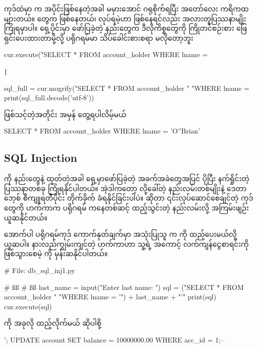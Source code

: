  ကုဒ်ထဲမှာ  က  အပိုင်းဖြစ်နေတဲ့အခါ မမှားအောင် ဂရုစိုက်ရပြီး အတော်လေး ကရိကထများတယ်။  တွေက  ဖြစ်နေတယ်၊  လုပ်ရမဲ့ဟာ ဖြစ်နေရင်လည်း အလားတူပြဿနာမျိုး ကြုံရမှာပါ။ ရှေ့ပိုင်းမှာ ဖော်ပြခဲ့တဲ့ နည်းတွေက ဒီလိုကိစ္စတွေကို ကြိုတင်စဉ်းစား ဖြေရှင်းပေးထားတာမို့လို့ ပရိုဂရမ်မာ သိပ်ခေါင်းစားစရာ မလိုတော့ဘူး
%
\begin{py}
cur.execute("SELECT * FROM account_holder WHERE lname = %
\end{py}
%
\texttt|%
%
\begin{py}
sql_full = cur.mogrify("SELECT * FROM account_holder "
                       "WHERE lname = %
print(sql_full.decode('utf-8'))
\end{py}
%
ဖြစ်သင့်တဲ့အတိုင်း  အမှန် တွေ့ရပါလိမ့်မယ်
%
\begin{codetxt}
SELECT * FROM account_holder WHERE lname = 'O''Brian'
\end{codetxt}
%

\subsection*{SQL Injection}
 ကို  နည်းတွေနဲ့ ထုတ်တဲ့အခါ ရှေ့မှာဖော်ပြခဲ့တဲ့ အခက်အခဲတွေအပြင် ပိုပြီး နက်ရှိုင်းတဲ့ ပြဿနာတစ်ခု ကြုံရနိုင်ပါတယ်။ အဲ့ဒါကတော့  လို့ခေါ်တဲ့ နည်းလမ်းတစ်မျိုးနဲ့ ဒေတာဘေ့စ် စီကျူရတီပိုင်း တိုက်ခိုက် ခံရနိုင်ခြင်းပါပဲ။  ဆိုတာ ၎င်းလုပ်ဆောင်စေချင်တဲ့  ကုဒ်တွေကို ဟက်ကာက ပရိုဂရမ်  ကနေတစ်ဆင့် ထည့်သွင်းတဲ့ နည်းလမ်းလို့ အကြမ်းဖျဉ်း ယူဆနိုင်တယ်။

အောက်ပါ ပရိုဂရမ်ကုဒ် ကောက်နုတ်ချက်မှာ အသုံးပြုသူ  က  ကို  ထည့်ပေးမယ်လို့ ယူဆပါ။  နားလည်ကျွမ်းကျင်တဲ့ ဟက်ကာဟာ သူ့ရဲ့ အကောင့် လက်ကျန်ငွေစာရင်းကို  ဖြစ်သွားစေမဲ့  ကို မှန်းဆနိုင်ပါတယ်။  
%
\begin{py}
# File: db_sql_inj1.py 

# ßß
# ßß
last_name = input("Enter last name: ")
sql = ("SELECT * FROM account_holder "
       "WHERE lname = '") + last_name + "'"
print(sql)
cur.execute(sql)
\end{py}
%
 ကို အခုလို ထည့်လိုက်မယ် ဆိုပါစို့ 
\begin{codetxt}
'; UPDATE account SET balance = 10000000.00 WHERE acc_id = 1;--
\end{codetxt}

